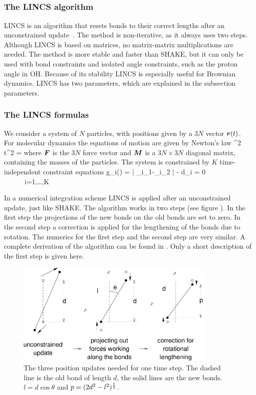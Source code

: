 \subsection{}

\subsubsection{The LINCS algorithm}
LINCS is an algorithm that resets bonds to their correct lengths
after an unconstrained update~\cite{Hess97}. 
The method is non-iterative, as it always uses two steps.
Although LINCS is based on matrices, no matrix-matrix multiplications are 
needed. The method is more stable and faster than SHAKE, 
but it can only be used with bond constraints and 
isolated angle constraints, such as the proton angle in OH. 
Because of its stability LINCS is especially useful for Brownian dynamics. 
LINCS has two parameters, which are explained in the subsection parameters.
 
\subsubsection{The LINCS formulas}
We consider a system of $N$ particles, with positions given by a
$3N$ vector $\mbox{\boldmath ${r}$}(t)$.
For molecular dynamics the equations of motion are given by Newton's law
{\de^2  \over \de t^2} = \iM {}
\fe
where $\mbox{\boldmath ${F}$}$ is the $3N$ force vector 
and $\mbox{\boldmath ${M}$}$ is a $3N \times 3N$ diagonal matrix,
containing the masses of the particles.
The system is constrained by $K$ time-independent constraint equations
g_i() = | _{i_1}-_{i_2} | - d_i = 0 ~~~~~~i=1,\ldots,K
\fe

In a numerical integration scheme LINCS is applied after an
unconstrained update, just like SHAKE. The algorithm works in two
steps (see figure ). In the first step the projections
of the new bonds on the old bonds are set to zero. In the second step
a correction is applied for the lengthening of the bonds due to
rotation. The numerics for the first step and the second step are very
similar. A complete derivation of the algorithm can be found in
\cite{Hess97}. Only a short description of the first step is given
here.

\begin{figure}
\centerline{\includegraphics[height=50mm]{plots/lincs}}
\caption[The three position updates needed for one time step.]{The
three position updates needed for one time step. The dashed line is
the old bond of length $d$, the solid lines are the new bonds. $l=d
\cos \theta$ and $p=(2 d^2 - l^2)^{1 \over 2}$.}
\label{fig:lincs}
\end{figure}


